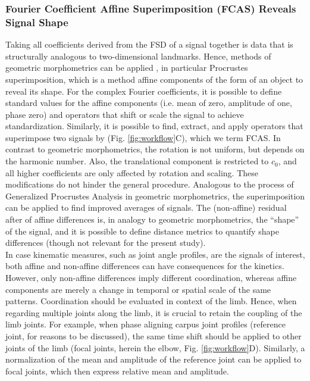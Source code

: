 \subsubsection{Fourier Coefficient Affine Superimposition (FCAS) Reveals Signal Shape}
Taking all coefficients derived from the FSD of a signal together is data that is structurally analogous to two-dimensional landmarks.
Hence, methods of geometric morphometrics can be applied \citep{Bookstein1991,Kendall1989,Gower1975,Dryden2016}, in particular Procrustes superimposition, which is a method  affine components of the form of an object to reveal its shape.
For the complex Fourier coefficients, it is possible to define standard values for the affine components (i.e. mean of zero, amplitude of one, phase zero) and operators that shift or scale the signal to achieve standardization.
Similarly, it is possible to find, extract, and apply operators that superimpose two signals by  (Fig. \ref{fig:workflow}C), which we term FCAS.
In contrast to geometric morphometrics, the rotation is not uniform, but depends on the harmonic number.
Also, the translational component is restricted to $c_{0}$, and all higher coefficients are only affected by rotation and scaling.
These modifications do not hinder the general procedure.
Analogous to the process of Generalized Procrustes Analysis in geometric morphometrics, the superimposition can be applied to find improved averages of signals.
The (non-affine) residual after  of affine differences is, in analogy to geometric morphometrics, the ``shape'' of the signal, and it is possible to define distance metrics to quantify shape differences (though not relevant for the present study).
\\In case kinematic measures, such as joint angle profiles, are the signals of interest, both affine and non-affine differences can have consequences for the kinetics.
However, only non-affine differences imply different coordination, whereas affine components are merely a change in temporal or spatial scale of the same patterns.
Coordination should be evaluated in context of the limb.
Hence, when regarding multiple joints along the limb, it is crucial to retain the coupling of the limb joints.
For example, when phase aligning carpus joint profiles (reference joint, for reasons to be discussed), the same time shift should be applied to other joints of the limb (focal joints, herein the elbow, Fig. \ref{fig:workflow}D).
Similarly, a normalization of the mean and amplitude of the reference joint can be applied to focal joints, which then express relative mean and amplitude.
